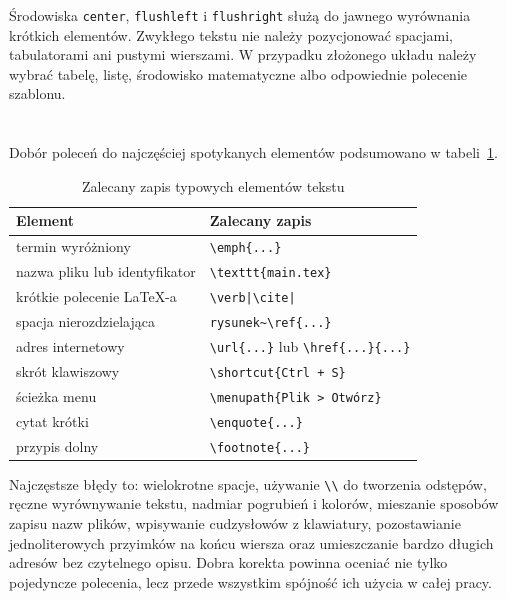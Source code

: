 Środowiska \texttt{center}, \texttt{flushleft} i \texttt{flushright} służą do jawnego wyrównania krótkich elementów. Zwykłego tekstu nie należy pozycjonować spacjami, tabulatorami ani pustymi wierszami. W przypadku złożonego układu należy wybrać tabelę, listę, środowisko matematyczne albo odpowiednie polecenie szablonu.

\section{}

Dobór poleceń do najczęściej spotykanych elementów podsumowano w tabeli~\ref{tab:formatowanie-dobor-polecenia}.

\begin{table}[htbp]
  \centering
  \caption{Zalecany zapis typowych elementów tekstu}
  \label{tab:formatowanie-dobor-polecenia}
  \begin{tabularx}{\textwidth}{@{}p{}X@{}}
    \toprule
    Element & Zalecany zapis \\
    \midrule
    termin wyróżniony & \texttt{\textbackslash emph\{...\}} \\
    nazwa pliku lub identyfikator & \texttt{\textbackslash texttt\{main.tex\}} \\
    krótkie polecenie LaTeX-a & \texttt{\textbackslash verb|\textbackslash cite|} \\
    spacja nierozdzielająca & \texttt{rysunek\textasciitilde\textbackslash ref\{...\}} \\
    adres internetowy & \texttt{\textbackslash url\{...\}} lub \texttt{\textbackslash href\{...\}\{...\}} \\
    skrót klawiszowy & \texttt{\textbackslash shortcut\{Ctrl + S\}} \\
    ścieżka menu & \texttt{\textbackslash menupath\{Plik > Otwórz\}} \\
    cytat krótki & \texttt{\textbackslash enquote\{...\}} \\
    przypis dolny & \texttt{\textbackslash footnote\{...\}} \\
    \bottomrule
  \end{tabularx}
\end{table}

Najczęstsze błędy to: wielokrotne spacje, używanie \verb|\\| do tworzenia odstępów, ręczne wyrównywanie tekstu, nadmiar pogrubień i kolorów, mieszanie sposobów zapisu nazw plików, wpisywanie cudzysłowów z klawiatury, pozostawianie jednoliterowych przyimków na końcu wiersza oraz umieszczanie bardzo długich adresów bez czytelnego opisu. Dobra korekta powinna oceniać nie tylko pojedyncze polecenia, lecz przede wszystkim spójność ich użycia w całej pracy.
